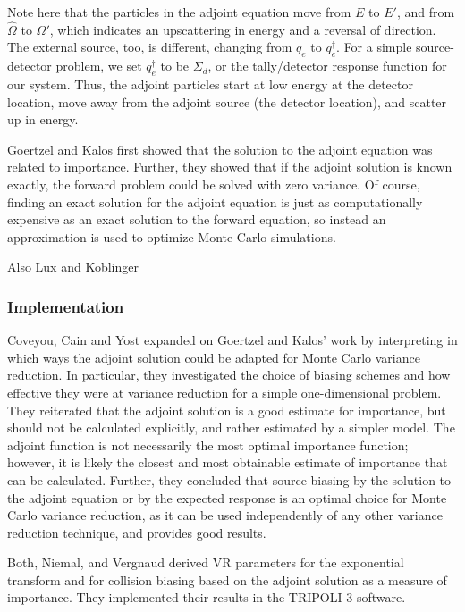 Note here that the particles in the adjoint equation move from $E$ to $E'$, and
from $\hat\Omega$ to $\hat\Omega'$, which indicates an upscattering in energy
and a reversal of direction. The external source, too, is different, changing
from $q_{e}$ to $q_{e}^\dagger$. For a simple source-detector problem, we set
$q_{e}^\dagger$ to be $\Sigma _{ d }$, or the tally/detector response function
for our system. Thus, the adjoint particles start at low energy at the detector
location, move away from the adjoint source (the detector location), and scatter
up in energy.

Goertzel \cite{goertzel_monte_1958} and Kalos \cite{kalos_importance_1963} first
showed that the solution to the adjoint equation was related to importance.
Further, they showed that if the adjoint solution is known exactly, the forward
problem could be solved with zero variance. Of course, finding an exact solution
for the adjoint equation is just as computationally expensive as an exact
solution to the forward equation, so instead an approximation is used to
optimize Monte Carlo simulations.

Also Lux and Koblinger \cite{lux_monte_carlo}

\subsubsection{Implementation}

Coveyou, Cain and Yost \cite{coveyou_adjoint_1967} expanded on Goertzel and
Kalos' work by interpreting in which ways the adjoint solution could be adapted
for Monte Carlo variance reduction. In particular, they investigated the choice
of biasing schemes and how effective they were at variance reduction for a
simple one-dimensional problem. They reiterated that the adjoint solution is a
good estimate for importance, but should not be calculated explicitly, and
rather estimated by a simpler model. The adjoint function is not necessarily the
most optimal importance function; however, it is likely the closest and most
obtainable estimate of importance that can be calculated. Further, they
concluded that source biasing by the solution to the adjoint equation or by the
expected response is an optimal choice for Monte Carlo variance reduction, as it
can be used independently of any other variance reduction technique, and
provides good results.

Both, Niemal, and Vergnaud \cite{both_automated_1990} derived VR parameters for
the exponential transform and for collision biasing based on the adjoint
solution as a measure of importance. They implemented their results in the
TRIPOLI-3 software.


